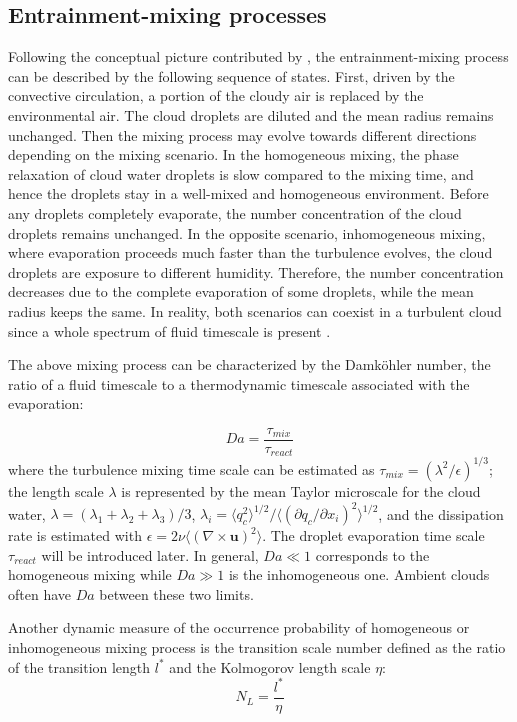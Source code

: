 \subsection{Entrainment-mixing processes}
Following the conceptual picture contributed by \cite{Krueger1997Modeling,Grabowski1993Cumulus, Burnet2007Observational}, 
the entrainment-mixing process can be described by the following sequence of states.  
First, driven by the convective circulation, a portion of the cloudy air is replaced 
by the environmental air. The cloud droplets are diluted and the mean radius remains 
unchanged. Then the mixing process may evolve towards different directions depending on the mixing 
scenario. In the homogeneous mixing, the phase relaxation of cloud water droplets is 
slow compared to the mixing time, and hence the droplets stay in a well-mixed and 
homogeneous environment. Before any droplets completely evaporate, the number concentration 
of the cloud droplets remains unchanged. In the opposite scenario, inhomogeneous 
mixing, where evaporation proceeds much faster than the turbulence evolves, 
the cloud droplets are exposure to different humidity. Therefore, the number concentration 
decreases due to the complete evaporation of some droplets, while the mean radius
keeps the same. In reality, both scenarios can coexist in a turbulent cloud since 
a whole spectrum of fluid timescale is present \cite{Lehmann2009}.

The above mixing process can be characterized by the Damk{\"o}hler number, the ratio of 
a fluid timescale to a thermodynamic timescale associated with the evaporation:

\begin{equation}
Da=\frac{\tau_{mix}}{\tau_{react}}\label{eq:DaNumber}
\end{equation}
where the turbulence mixing time scale can be estimated as $\tau_{mix} = (\lambda^2/\epsilon)^{1/3}$; the 
length scale $\lambda$ is represented by the mean Taylor microscale for the cloud water, $\lambda = 
(\lambda_1+\lambda_2+\lambda_3)/3$, $\lambda_i = \langle q_c^2\rangle^{1/2}/\langle(\partial q_c/\partial 
x_i)^2\rangle^{1/2}$, and the dissipation rate is estimated with $\epsilon = 2\nu\langle(\nabla\times 
\mathbf{u})^2\rangle$. The droplet evaporation time scale $\tau_{react}$ will be introduced later.
In general, $Da\ll1$ corresponds to the homogeneous mixing while $Da\gg1$ is
the inhomogeneous one. Ambient clouds often have $Da$ between these two limits.

Another dynamic measure of the occurrence probability of homogeneous or inhomogeneous 
mixing process is the transition scale number \cite{Lu2011} defined as the ratio of 
the transition length $l^{*}$ and the Kolmogorov length scale $\eta$:
\begin{equation}
N_{L}=\frac{l^{*}}{\eta}\label{eq:NL}
\end{equation}
 
